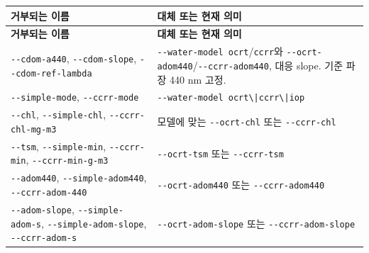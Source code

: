 {\TableFont
\begin{longtable}{@{}>{\raggedright\arraybackslash}p{}>{\raggedright\arraybackslash}p{}@{}}
\toprule
\textbf{거부되는 이름} & \textbf{대체 또는 현재 의미} \\
\midrule
\endfirsthead
\toprule
\textbf{거부되는 이름} & \textbf{대체 또는 현재 의미} \\
\midrule
\endhead
\bottomrule
\endfoot
\texttt{-\allowbreak{}-\allowbreak{}cdom-\allowbreak{}a440}, \texttt{-\allowbreak{}-\allowbreak{}cdom-\allowbreak{}slope}, \texttt{-\allowbreak{}-\allowbreak{}cdom-\allowbreak{}ref-\allowbreak{}lambda} & \texttt{-\allowbreak{}-\allowbreak{}water-\allowbreak{}model ocrt}/\texttt{ccrr}와 \texttt{-\allowbreak{}-\allowbreak{}ocrt-\allowbreak{}adom440}/\texttt{-\allowbreak{}-\allowbreak{}ccrr-\allowbreak{}adom440}, 대응 slope. 기준 파장 440 nm 고정. \\
\texttt{-\allowbreak{}-\allowbreak{}simple-\allowbreak{}mode}, \texttt{-\allowbreak{}-\allowbreak{}ccrr-\allowbreak{}mode} & \texttt{-\allowbreak{}-\allowbreak{}water-\allowbreak{}model ocrt\textbackslash{}|ccrr\allowbreak{}\textbackslash{}|iop} \\
\texttt{-\allowbreak{}-\allowbreak{}chl}, \texttt{-\allowbreak{}-\allowbreak{}simple-\allowbreak{}chl}, \texttt{-\allowbreak{}-\allowbreak{}ccrr-\allowbreak{}chl-\allowbreak{}mg-\allowbreak{}m3} & 모델에 맞는 \texttt{-\allowbreak{}-\allowbreak{}ocrt-\allowbreak{}chl} 또는 \texttt{-\allowbreak{}-\allowbreak{}ccrr-\allowbreak{}chl} \\
\texttt{-\allowbreak{}-\allowbreak{}tsm}, \texttt{-\allowbreak{}-\allowbreak{}simple-\allowbreak{}min}, \texttt{-\allowbreak{}-\allowbreak{}ccrr-\allowbreak{}min}, \texttt{-\allowbreak{}-\allowbreak{}ccrr-\allowbreak{}min-\allowbreak{}g-\allowbreak{}m3} & \texttt{-\allowbreak{}-\allowbreak{}ocrt-\allowbreak{}tsm} 또는 \texttt{-\allowbreak{}-\allowbreak{}ccrr-\allowbreak{}tsm} \\
\texttt{-\allowbreak{}-\allowbreak{}adom440}, \texttt{-\allowbreak{}-\allowbreak{}simple-\allowbreak{}adom440}, \texttt{-\allowbreak{}-\allowbreak{}ccrr-\allowbreak{}adom-\allowbreak{}440} & \texttt{-\allowbreak{}-\allowbreak{}ocrt-\allowbreak{}adom440} 또는 \texttt{-\allowbreak{}-\allowbreak{}ccrr-\allowbreak{}adom440} \\
\texttt{-\allowbreak{}-\allowbreak{}adom-\allowbreak{}slope}, \texttt{-\allowbreak{}-\allowbreak{}simple-\allowbreak{}adom-\allowbreak{}s}, \texttt{-\allowbreak{}-\allowbreak{}simple-\allowbreak{}adom-\allowbreak{}slope}, \texttt{-\allowbreak{}-\allowbreak{}ccrr-\allowbreak{}adom-\allowbreak{}s} & \texttt{-\allowbreak{}-\allowbreak{}ocrt-\allowbreak{}adom-\allowbreak{}slope} 또는 \texttt{-\allowbreak{}-\allowbreak{}ccrr-\allowbreak{}adom-\allowbreak{}slope} \\

\end{longtable}}
